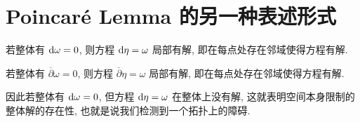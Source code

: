     \section[Poincar\'e Lemma]{Poincar\'e Lemma 的另一种表述形式}
        \begin{lemma}
            若整体有 ${\rm d}\omega = 0$, 则方程 ${\rm d}\eta=\omega$ 局部有解, 即在每点处存在邻域使得方程有解.
        \end{lemma}
        \begin{lemma}
            若整体有 $\overline{\partial}\omega = 0$, 则方程 $\overline{\partial}\eta=\omega$ 局部有解, 即在每点处存在邻域使得方程有解.
        \end{lemma}
        \begin{remark}
            因此若整体有 ${\rm d}\omega = 0$, 但方程 ${\rm d}\eta=\omega$ 在整体上没有解, 这就表明空间本身限制的整体解的存在性, 也就是说我们检测到一个拓扑上的障碍.
        \end{remark}